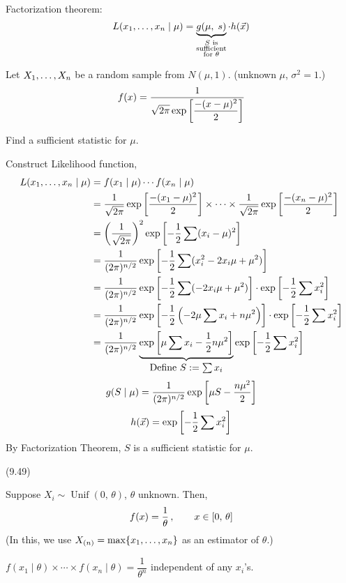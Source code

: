 \nl Factorization theorem:
$$L({x}_1, \dots, {x}_n \mid \mu) = \underbrace{g(\mu,\;s)}_{\substack{S \text{ is} \\ \text{sufficient} \\ \text{for } \theta }} \cdot h(\vec{x})$$

\example Let ${X}_1, \dots, {X}_n$ be a random sample from $N(\mu,1)$. \color{blue} (unknown $\mu$, $\sigma^2 = 1$.)\color{black}
$$f(x) = \frac{1}{\sqrt{2\pi} \exp\brac{\dfrac{-(x-\mu)^2}{2}}}$$

\nl Find a sufficient statistic for $\mu$.

\nl Construct Likelihood function,
\begin{align}
    L(\thru{x}\mid \mu) &= f(x_1 \mid \mu) \cdots f(x_n \mid \mu)\notag\\
    &= \frac{1}{\sqrt{2\pi}} \exp\brac{\frac{-(x_1-\mu)^2}{2}} \times \cdots\times \frac{1}{\sqrt{2\pi}} \exp\brac{\frac{-(x_n-\mu)^2}{2}}\notag\\
    &= \pars{\over{\sqrt{2\pi}}}^2\exp\brac{-\over{2} \sum (x_i - \mu)^2}\notag\\
    &= \over{(2\pi)^{n/2}}\exp\brac{-\over{2} \sum (x_i^2 - 2x_i\mu + \mu^2)}\notag\\
    &= \over{(2\pi)^{n/2}}\exp\brac{-\over{2} \sum (-2x_i\mu + \mu^2)}\cdot \exp\brac{-\over{2}\sum x_i^2}\notag\\
    &= \over{(2\pi)^{n/2}}\exp\brac{-\over{2}\pars{-2\mu \sum x_i + n\mu^2}}\cdot \exp\brac{-\over{2}\sum x_i^2}\notag\\
    &= \over{(2\pi)^{n/2}}\underbrace{\exp\brac{\mu \sum x_i -\over{2}n\mu^2}}_{\textstyle \text{Define } S := \sum x_i}\exp\brac{-\over{2}\sum x_i^2}\notag
\end{align}
\color{ggreen}
$$g(S \mid \mu) = \over{(2\pi)^{n/2}} \operatorname{exp}\brac{\mu S - \frac{n\mu^2}{2}}$$
\color{orange}
$$h(\vec{x}) = \operatorname{exp}\brac{-\over{2}\sum x_i^2}$$\color{black}
By Factorization Theorem, $S$ is a sufficient statistic for $\mu$.

\example (9.49)

\nl Suppose $X_i \sim \operatorname{Unif}(0,\,\theta)$, $\theta$ unknown. Then,
$$f(x) = \over{\theta} \,, \qquad x \in [0, \, \theta]$$
(In this, we use $X_{(n)} = \operatorname{max}\{{x}_1, \dots, {x}_n\}$ as an estimator of $\theta$.)

\nl $f(x_1 \mid \theta) \times \cdots \times f(x_n \mid \theta) = \dfrac{1}{\theta^n}$
independent of any $x_i$'s.

